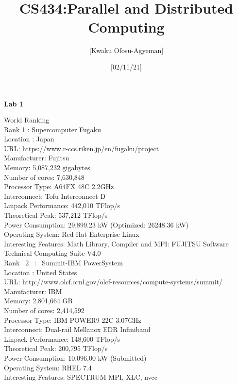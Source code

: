 \documentclass{article}
\title{\textbf{CS434:Parallel and Distributed Computing}}
\author{[Kwaku Ofosu-Agyeman]}
\date{[02/11/21]}
\begin{document}
\maketitle

\begin{center}  
\begin{large}  
\textbf{ Lab 1\\}
\end{large} 
\end{center} 

\newpage

World Ranking \\
Rank  1  :  Supercomputer Fugaku \\
Location : Japan \\
URL: https://www.r-ccs.riken.jp/en/fugaku/project \\
Manufacturer: Fujitsu \\
Memory: 5,087,232 gigabytes \\
Number of cores: 7,630,848 \\
Processor Type: A64FX 48C 2.2GHz \\
Interconnect:  Tofu Interconnect D \\
Linpack Performance: 442,010 TFlop/s\\
Theoretical Peak: 537,212 TFlop/s\\
Power Consumption:  29,899.23 kW (Optimized: 26248.36 kW)\\
Operating System: Red Hat Enterprise Linux\\
Interesting Features: Math Library, Compiler and MPI: FUJITSU Software Technical Computing Suite V4.0\\

Rank \ 2 \ : \ Summit-IBM PowerSystem \\
Location : United States\\
URL:  http://www.olcf.ornl.gov/olcf-resources/compute-systems/summit/\\
Manufacturer: IBM\\
Memory: 2,801,664 GB\\
Number of cores: 2,414,592\\
 Processor Type: IBM POWER9 22C 3.07GHz\\
Interconnect: Dual-rail Mellanox EDR Infiniband\\
Linpack Performance: 148,600 TFlop/s\\
Theoretical Peak: 200,795 TFlop/s\\
Power Consumption: 10,096.00 kW (Submitted)\\
Operating System: RHEL 7.4\\
Interesting Features: SPECTRUM MPI, XLC, nvcc\\
\end{document}
